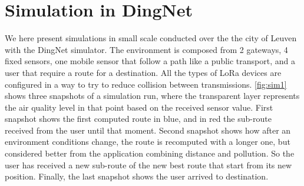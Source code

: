 \section{Simulation in DingNet}
We here present simulations in small scale conducted over the the city of Leuven with the DingNet simulator. 
The environment is composed from 2 gateways, 4 fixed sensors, one mobile sensor that follow a path like a public transport, and a user that require a route for a destination.
All the types of LoRa devices are configured in a way to try to reduce collision between transmissions.
\autoref{fig:sim1} shows three snapshots of a simulation run, where the transparent layer represents the air quality level in that point based on the received sensor value.
First snapshot shows the first computed route in blue, and in red the sub-route received from the user until that moment.
Second snapshot shows how after an environment conditions change, the route is recomputed with a longer one, but considered better from the application combining distance and pollution. 
So the user has received a new sub-route of the new best route that start from its new position.
Finally, the last snapshot shows the user arrived to destination.
% 
